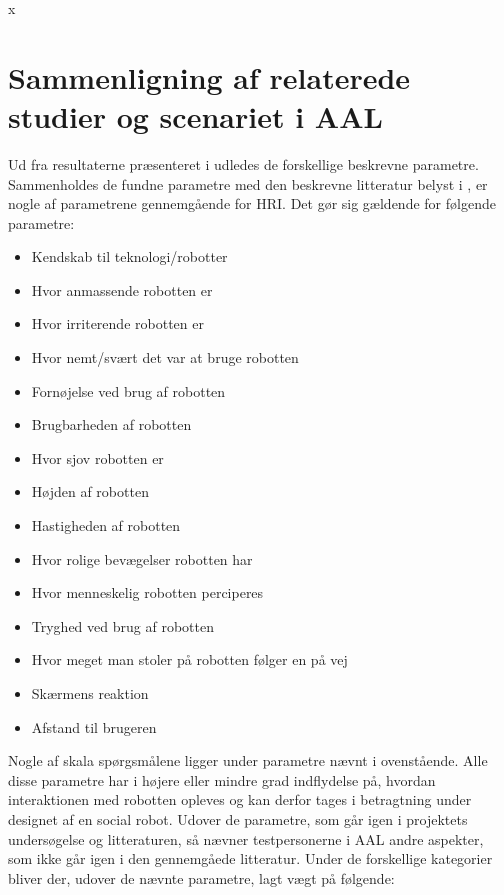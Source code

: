 x\section{Sammenligning af relaterede studier og scenariet i AAL}
\label{ParametreTidligereStudier}
%
Ud fra resultaterne præsenteret i  udledes de forskellige beskrevne parametre. Sammenholdes de fundne parametre med den beskrevne litteratur belyst i , er nogle af parametrene gennemgående for HRI. Det gør sig gældende for følgende parametre:\blankline
%
\begin{multicols}{2}
	\begin{itemize}
		\item Kendskab til teknologi/robotter
		\item Hvor anmassende robotten er
		\item Hvor irriterende robotten er
		\item Hvor nemt/svært det var at bruge robotten
		\item Fornøjelse ved brug af robotten
		\item Brugbarheden af robotten
		\item Hvor sjov robotten er
		\item Højden af robotten
		\item Hastigheden af robotten
		\item Hvor rolige bevægelser robotten har
		\item Hvor menneskelig robotten perciperes
		\item Tryghed ved brug af robotten
		\item Hvor meget man stoler på robotten følger en på vej
		\item Skærmens reaktion
		\item Afstand til brugeren
	\end{itemize}
\end{multicols}
\noindent
%
Nogle af skala spørgsmålene ligger under parametre nævnt i ovenstående. Alle disse parametre har i højere eller mindre grad indflydelse på, hvordan interaktionen med robotten opleves og kan derfor tages i betragtning under designet af en social robot. \blankline
%
Udover de parametre, som går igen i projektets undersøgelse og litteraturen, så nævner testpersonerne i AAL andre aspekter, som ikke går igen i den gennemgåede litteratur. Under de forskellige kategorier bliver der, udover de nævnte parametre, lagt vægt på følgende:
%
